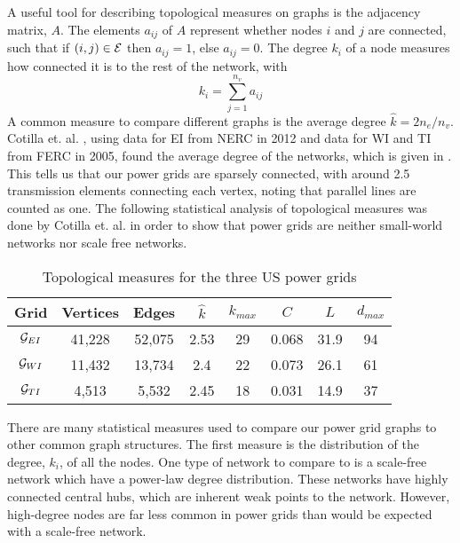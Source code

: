 A useful tool for describing topological measures on graphs is the adjacency matrix, $A$.  The elements $a_{ij}$ of $A$ represent whether nodes $i$ and $j$ are connected, such that if $(i,j) \in \mathcal{E}$ then $a_{ij} = 1$, else $a_{ij}=0$.  The degree $k_i$ of a node measures how connected it is to the rest of the network, with
\begin{equation}
k_i = \sum_{j=1}^{n_v} a_{ij}
\end{equation}
A common measure to compare different graphs is the average degree $\hat{k} = 2 n_e/n_v$.  Cotilla et. al. \cite{cotilla_2012}, using data for EI from NERC in 2012 and data for WI and TI from FERC in 2005, found the average degree of the networks, which is given in .  This tells us that our power grids are sparsely connected, with around 2.5 transmission elements connecting each vertex, noting that parallel lines are counted as one.  The following statistical analysis of topological measures was done by Cotilla et. al. \cite{cotilla_2012} in order to show that power grids are neither small-world networks nor scale free networks.

\begin{table}
\centering
\begin{tabular}{| c | c c c c c c c|}
\hline
Grid & Vertices & Edges & $\hat{k}$  &  $k_{max}$ & $C$ & $L$ & $d_{max}$ \\
\hline
$\mathcal{G}_{EI}$	& 41,228	&	52,075	&	2.53	&	29	&	0.068	&	31.9	&	94	\\
$\mathcal{G}_{WI}$	& 11,432	&	13,734	&	2.4	&	22	&	0.073	&	26.1	&	61	\\
$\mathcal{G}_{TI}$ 	& 4,513	&	5,532		&	2.45	&	18	&	0.031	&	14.9	&	37	\\
\hline
\end{tabular}
\caption{Topological measures for the three US power grids}
\label{tab:topo_info}
\end{table}


There are many statistical measures used to compare our power grid graphs to other common graph structures.  The first measure is the distribution of the degree, $k_i$, of all the nodes.  One type of network to compare to is a scale-free network which have a power-law degree distribution.  These networks have highly connected central hubs, which are inherent weak points to the network.  However, high-degree nodes are far less common in power grids than would be expected with a scale-free network.    

